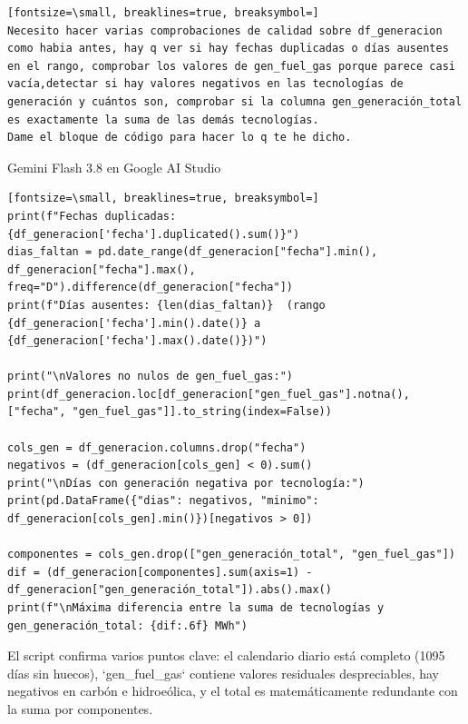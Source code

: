 \documentclass[12pt,a4paper,oneside]{book}
\begin{document}
\begin{iaprompt}
\begin{Verbatim}[fontsize=\small, breaklines=true, breaksymbol=]
Necesito hacer varias comprobaciones de calidad sobre df_generacion como habia antes, hay q ver si hay fechas duplicadas o días ausentes en el rango, comprobar los valores de gen_fuel_gas porque parece casi vacía,detectar si hay valores negativos en las tecnologías de generación y cuántos son, comprobar si la columna gen_generación_total es exactamente la suma de las demás tecnologías.
Dame el bloque de código para hacer lo q te he dicho.
\end{Verbatim}
\end{iaprompt}
\begin{iaresp}{Gemini Flash 3.8 en Google AI Studio}
\begin{Verbatim}[fontsize=\small, breaklines=true, breaksymbol=]
print(f"Fechas duplicadas: {df_generacion['fecha'].duplicated().sum()}")
dias_faltan = pd.date_range(df_generacion["fecha"].min(), df_generacion["fecha"].max(), freq="D").difference(df_generacion["fecha"])
print(f"Días ausentes: {len(dias_faltan)}  (rango {df_generacion['fecha'].min().date()} a {df_generacion['fecha'].max().date()})")

print("\nValores no nulos de gen_fuel_gas:")
print(df_generacion.loc[df_generacion["gen_fuel_gas"].notna(), ["fecha", "gen_fuel_gas"]].to_string(index=False))

cols_gen = df_generacion.columns.drop("fecha")
negativos = (df_generacion[cols_gen] < 0).sum()
print("\nDías con generación negativa por tecnología:")
print(pd.DataFrame({"dias": negativos, "minimo": df_generacion[cols_gen].min()})[negativos > 0])

componentes = cols_gen.drop(["gen_generación_total", "gen_fuel_gas"])
dif = (df_generacion[componentes].sum(axis=1) - df_generacion["gen_generación_total"]).abs().max()
print(f"\nMáxima diferencia entre la suma de tecnologías y gen_generación_total: {dif:.6f} MWh")
\end{Verbatim}
\end{iaresp}
\begin{iaanalisis}
El script confirma varios puntos clave: el calendario diario está completo (1095 días sin huecos), `gen_fuel_gas` contiene valores residuales despreciables, hay negativos en carbón e hidroeólica, y el total es matemáticamente redundante con la suma por componentes.
\end{iaanalisis}
\end{document}
